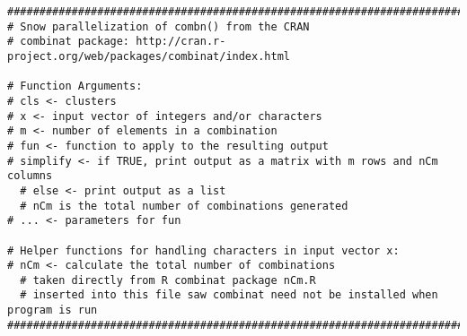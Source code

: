 {
\begin{lstlisting}
####################################################################################
# Snow parallelization of combn() from the CRAN
# combinat package: http://cran.r-project.org/web/packages/combinat/index.html

# Function Arguments:
# cls <- clusters
# x <- input vector of integers and/or characters
# m <- number of elements in a combination
# fun <- function to apply to the resulting output
# simplify <- if TRUE, print output as a matrix with m rows and nCm columns
  # else <- print output as a list 
  # nCm is the total number of combinations generated
# ... <- parameters for fun

# Helper functions for handling characters in input vector x:
# nCm <- calculate the total number of combinations 
  # taken directly from R combinat package nCm.R
  # inserted into this file saw combinat need not be installed when program is run
####################################################################################


\end{lstlisting}}
